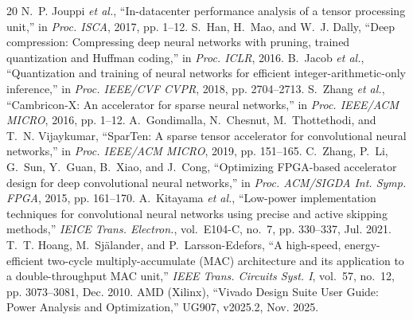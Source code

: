 \documentclass[11pt,journal,draftclsnofoot,onecolumn]{IEEEtran}
\begin{document}
\begin{thebibliography}{20}
 N.~P. Jouppi \emph{et al.}, ``In-datacenter performance analysis of a tensor processing unit,'' in \emph{Proc. ISCA}, 2017, pp. 1--12.
 S.~Han, H.~Mao, and W.~J. Dally, ``Deep compression: Compressing deep neural networks with pruning, trained quantization and Huffman coding,'' in \emph{Proc. ICLR}, 2016.
 B.~Jacob \emph{et al.}, ``Quantization and training of neural networks for efficient integer-arithmetic-only inference,'' in \emph{Proc. IEEE/CVF CVPR}, 2018, pp. 2704--2713.
 S.~Zhang \emph{et al.}, ``Cambricon-X: An accelerator for sparse neural networks,'' in \emph{Proc. IEEE/ACM MICRO}, 2016, pp. 1--12.
 A.~Gondimalla, N.~Chesnut, M.~Thottethodi, and T.~N. Vijaykumar, ``SparTen: A sparse tensor accelerator for convolutional neural networks,'' in \emph{Proc. IEEE/ACM MICRO}, 2019, pp. 151--165.
 C.~Zhang, P.~Li, G.~Sun, Y.~Guan, B.~Xiao, and J.~Cong, ``Optimizing FPGA-based accelerator design for deep convolutional neural networks,'' in \emph{Proc. ACM/SIGDA Int. Symp. FPGA}, 2015, pp. 161--170.
 A.~Kitayama \emph{et al.}, ``Low-power implementation techniques for convolutional neural networks using precise and active skipping methods,'' \emph{IEICE Trans. Electron.}, vol.~E104-C, no.~7, pp. 330--337, Jul. 2021. %
 T.~T. Hoang, M.~Sj{\"a}lander, and P.~Larsson-Edefors, ``A high-speed, energy-efficient two-cycle multiply-accumulate (MAC) architecture and its application to a double-throughput MAC unit,'' \emph{IEEE Trans. Circuits Syst. I}, vol.~57, no.~12, pp. 3073--3081, Dec. 2010.
 AMD (Xilinx), ``Vivado Design Suite User Guide: Power Analysis and Optimization,'' UG907, v2025.2, Nov. 2025. %
\end{thebibliography}
\end{document}
